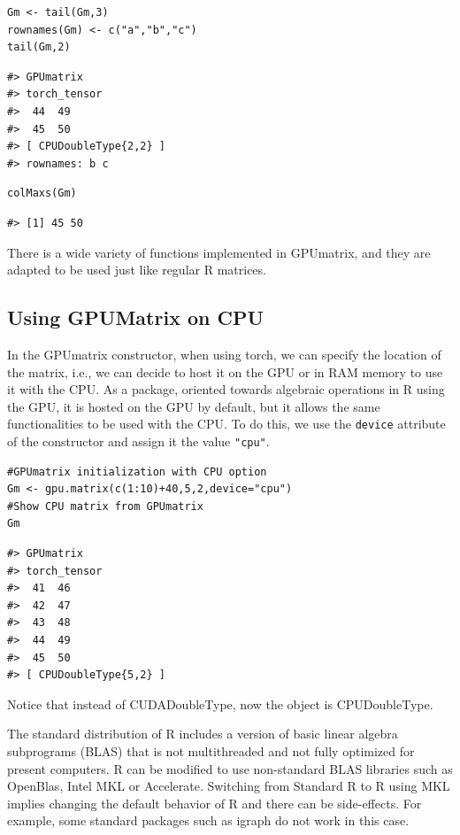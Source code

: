 \begin{verbatim}
Gm <- tail(Gm,3)
rownames(Gm) <- c("a","b","c")
tail(Gm,2)
\end{verbatim}

\begin{verbatim}
#> GPUmatrix
#> torch_tensor
#>  44  49
#>  45  50
#> [ CPUDoubleType{2,2} ]
#> rownames: b c
\end{verbatim}

\begin{verbatim}
colMaxs(Gm)
\end{verbatim}

\begin{verbatim}
#> [1] 45 50
\end{verbatim}

There is a wide variety of functions implemented in GPUmatrix, and they are adapted to be used just like regular R matrices.

\hypertarget{using-gpumatrix-on-cpu}{%
\subsection{Using GPUMatrix on CPU}\label{using-gpumatrix-on-cpu}}

In the GPUmatrix constructor, when using torch, we can specify the location of the matrix, i.e., we can decide to host it on the GPU or in RAM memory to use it with the CPU. As a package, oriented towards algebraic operations in R using the GPU, it is hosted on the GPU by default, but it allows the same functionalities to be used with the CPU. To do this, we use the \texttt{device} attribute of the constructor and assign it the value \texttt{"cpu"}.

\begin{verbatim}
#GPUmatrix initialization with CPU option
Gm <- gpu.matrix(c(1:10)+40,5,2,device="cpu")
#Show CPU matrix from GPUmatrix
Gm
\end{verbatim}

\begin{verbatim}
#> GPUmatrix
#> torch_tensor
#>  41  46
#>  42  47
#>  43  48
#>  44  49
#>  45  50
#> [ CPUDoubleType{5,2} ]
\end{verbatim}

Notice that instead of CUDADoubleType, now the object is CPUDoubleType.

The standard distribution of R includes a version of basic linear algebra subprograms (BLAS) that is not multithreaded and not fully optimized for present computers. R can be modified to use non-standard BLAS libraries such as OpenBlas, Intel MKL or Accelerate. Switching from Standard R to R using MKL implies changing the default behavior of R and there can be side-effects. For example, some standard packages such as igraph do not work in this case.

